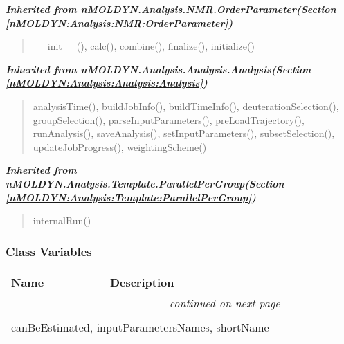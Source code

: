 \large{\textbf{\textit{Inherited from nMOLDYN.Analysis.NMR.OrderParameter\textit{(Section \ref{nMOLDYN:Analysis:NMR:OrderParameter})}}}}

\begin{quote}
\_\_init\_\_(), calc(), combine(), finalize(), initialize()
\end{quote}

\large{\textbf{\textit{Inherited from nMOLDYN.Analysis.Analysis.Analysis\textit{(Section \ref{nMOLDYN:Analysis:Analysis:Analysis})}}}}

\begin{quote}
analysisTime(), buildJobInfo(), buildTimeInfo(), deuterationSelection(), groupSelection(), parseInputParameters(), preLoadTrajectory(), runAnalysis(), saveAnalysis(), setInputParameters(), subsetSelection(), updateJobProgress(), weightingScheme()
\end{quote}

\large{\textbf{\textit{Inherited from nMOLDYN.Analysis.Template.ParallelPerGroup\textit{(Section \ref{nMOLDYN:Analysis:Template:ParallelPerGroup})}}}}

\begin{quote}
internalRun()
\end{quote}


  \subsubsection{Class Variables}

    \vspace{-1cm}
\hspace{\varindent}\begin{longtable}{|p{\varnamewidth}|p{\vardescrwidth}|l}
\cline{1-2}
\cline{1-2} \centering \textbf{Name} & \centering \textbf{Description}& \\
\cline{1-2}
\endhead\cline{1-2}\multicolumn{3}{r}{\small\textit{continued on next page}}\\\endfoot\cline{1-2}
\endlastfoot\multicolumn{2}{|l|}{\textit{Inherited from nMOLDYN.Analysis.NMR.OrderParameter \textit{(Section \ref{nMOLDYN:Analysis:NMR:OrderParameter})}}}\\
\multicolumn{2}{|p{\varwidth}|}{\raggedright canBeEstimated, inputParametersNames, shortName}\\
\cline{1-2}
\end{longtable}

